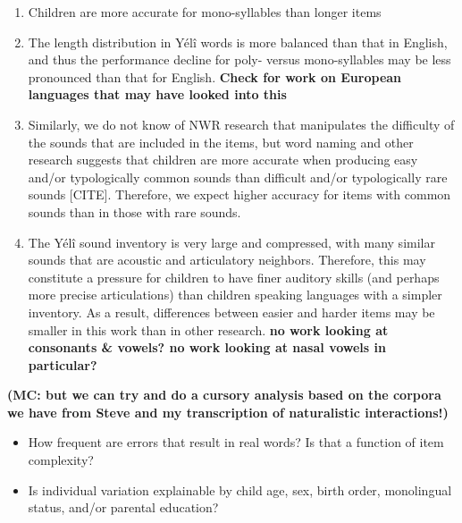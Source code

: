 \documentclass[english,,man,floatsintext]{apa6}
\providecommand{\tightlist}{%
  \setlength{\itemsep}{0pt}\setlength{\parskip}{0pt}}
\begin{document}
\begin{enumerate}
\def\labelenumi{\arabic{enumi}.}
\item
  Children are more accurate for mono-syllables than longer items
\item
  The length distribution in Yélî words is more balanced than that in
  English, and thus the performance decline for poly- versus
  mono-syllables may be less pronounced than that for English.
  \textbf{Check for work on European languages that may have looked into
  this}
\item
  Similarly, we do not know of NWR research that manipulates the
  difficulty of the sounds that are included in the items, but word
  naming and other research suggests that children are more accurate
  when producing easy and/or typologically common sounds than difficult
  and/or typologically rare sounds {[}CITE{]}. Therefore, we expect
  higher accuracy for items with common sounds than in those with rare
  sounds.
\item
  The Yélî sound inventory is very large and compressed, with many
  similar sounds that are acoustic and articulatory neighbors.
  Therefore, this may constitute a pressure for children to have finer
  auditory skills (and perhaps more precise articulations) than children
  speaking languages with a simpler inventory. As a result, differences
  between easier and harder items may be smaller in this work than in
  other research. \textbf{no work looking at consonants \& vowels? no
  work looking at nasal vowels in particular?}
\end{enumerate}

\textbf{(MC: but we can try and do a cursory analysis based on the
corpora we have from Steve and my transcription of naturalistic
interactions!)}

\begin{itemize}
\tightlist
\item
  How frequent are errors that result in real words? Is that a function
  of item complexity?
\item
  Is individual variation explainable by child age, sex, birth order,
  monolingual status, and/or parental education?
\end{itemize}
\end{document}
